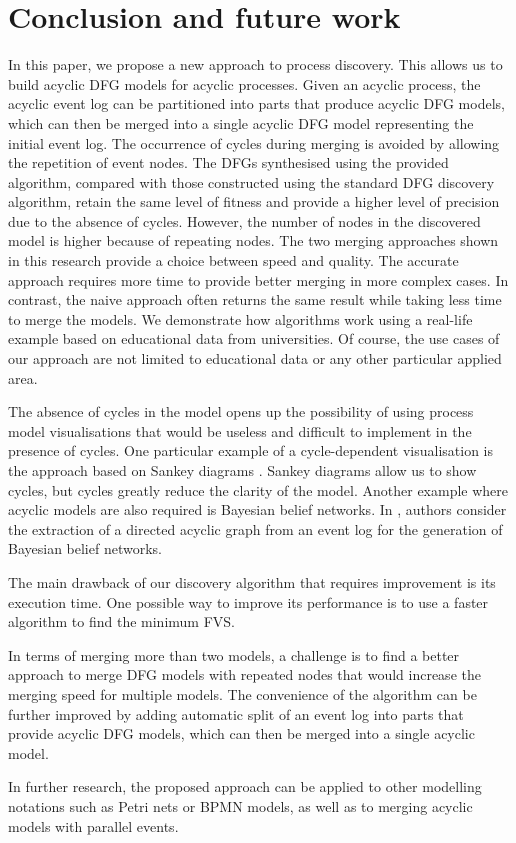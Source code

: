\documentclass[11pt]{article}
\theoremstyle{definition}
\begin{document}
\section{Conclusion and future work}\label{sec:conclusion}

In this paper, we propose a new approach to process discovery. This allows us to build acyclic DFG models for acyclic processes. Given an acyclic process, the acyclic event log can be partitioned into parts that produce acyclic DFG models, which can then be merged into a single acyclic DFG model representing the initial event log. 
The occurrence of cycles during merging is avoided by allowing the repetition of event nodes. The DFGs synthesised using the provided algorithm, compared with those constructed using the standard DFG discovery algorithm, retain the same level of fitness and provide a higher level of precision due to the absence of cycles.
However, the number of nodes in the discovered model is higher because of repeating nodes. 
The two merging approaches shown in this research provide a choice between speed and quality. The accurate approach requires more time to provide better merging in more complex cases. 
In contrast, the naive approach often returns the same result while taking less time to merge the models. We demonstrate how algorithms work
using a real-life example based on educational data from universities. Of course, the use cases of our approach are not limited to educational data or any other particular applied area.

The absence of cycles in the model opens up the possibility of using process model visualisations that would be useless and difficult to implement in the presence of cycles. 
One particular example of a cycle-dependent visualisation is the approach based on Sankey diagrams \cite{Derezovskiy}. 
Sankey diagrams allow us to show cycles, but cycles greatly reduce the clarity of the model. Another example where acyclic models are also required is Bayesian belief networks. In \cite{Vasilecas2014}, authors consider the extraction of a directed acyclic graph from an event log for the generation of Bayesian belief networks.

The main drawback of our discovery algorithm that requires improvement is its execution time. One possible way to improve its performance is to use a faster algorithm to find the minimum FVS. 

In terms of merging more than two models, a challenge is to find a better approach to merge DFG models with repeated nodes that would increase the merging speed for multiple models. The convenience of the algorithm can be further improved by adding automatic split of an event log into parts that provide acyclic DFG models, which can then be merged into a single acyclic model. 

In further research, the proposed approach can be applied to other modelling notations such as Petri nets or BPMN models, as well as to merging acyclic models with parallel events.




\end{document}

